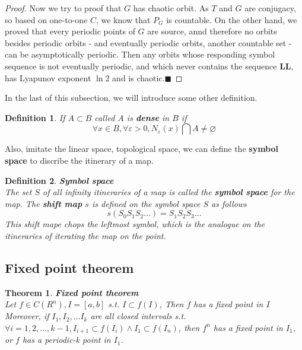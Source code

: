 \documentclass[12pt]{article}
\theoremstyle{plain}
\newtheorem{theorem}{\textbf{Theorem}}[section]
\newtheorem{definition}{{\color{red}\textbf{Definition}}}[section]
\newtheorem{proof}{\textit{PROOF}}[section]
\begin{document}
{\color{blue}
\begin{proof} Now we try to proof that $G$ has chaotic orbit. As $T$ and $G$ are conjugacy, so based on one-to-one $C$, we know that $P_G$ is countable. On the other hand, we proved that every periodic points of $G$ are source, annd therefore no orbits besides periodic orbits - and eventually periodic orbits, another countable set - can be asymptotically periodic. Then any orbits whose responding symbol sequence is not eventually periodic, and which never contains the sequence \textbf{LL}, has Lyapunov exponent $\ln 2$ and is chaotic.$\blacksquare$
\end{proof}
}

In the last of this subsection, we will introduce some other definition.

\begin{definition} If $A \subset B$ called $A$ is \textbf{dense} in $B$ if 
$$
\forall x \in B, \forall \varepsilon > 0, N_\varepsilon(x) \bigcap A \neq \varnothing
$$
\end{definition}

Also, imitate the linear space, topological space, we can define the \textbf{symbol space} to discribe the itinerary of a map.
\newpage
\begin{definition} \textbf{Symbol space}
\\\noindent The set $S$ of all infinity itineraries of a map is called the \textbf{symbol space} for the map. The \textbf{shift map} $s$ is defined on the symbol space $S$ as follows
$$
s(S_0S_1S_2\ldots) = S_1S_2S_3\ldots
$$
This shift mape chops the leftmost symbol, which is the analogue on the itineraries of iterating the map on the point.
\end{definition}






\subsection{Fixed point theorem}
\begin{theorem} \label{Fixed-point-theo}\textbf{Fixed point theorem}
\\\noindent Let $f \in C(R^n), I = [a, b]$ s.t. $I \subset f(I)$, Then $f$ has a fixed point in $I$
\\\noindent Moreover, if $I_1, I_2, \ldots I_k$ are all closed intervals s.t. $\forall i = 1, 2, \ldots ,k -1,I_{i+1}\subset f(I_i)  \land I_1 \subset f(I_n)$, then $f^n$ has a fixed point in $I_1$, or $f$ has a periodic-k point in $I_1$.
\end{theorem}
\end{document}
